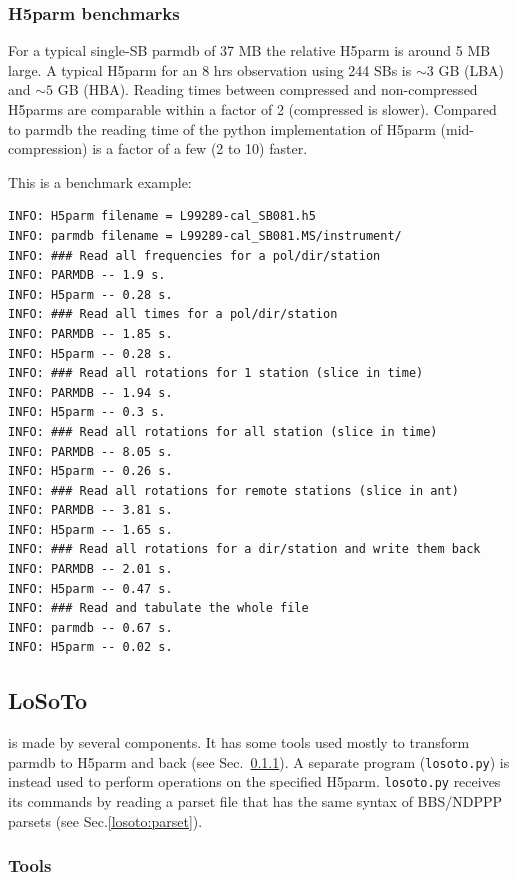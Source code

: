 \subsubsection{H5parm benchmarks}

For a typical single-SB parmdb of 37 MB the relative H5parm is around 5 MB large. A typical H5parm for an 8 hrs observation using 244 SBs is $\sim 3$ GB (LBA) and $\sim 5$ GB (HBA). Reading times between compressed and non-compressed H5parms are comparable within a factor of 2 (compressed is slower). Compared to parmdb the reading time of the python implementation of H5parm (mid-compression) is a factor of a few (2 to 10) faster.

This is a benchmark example:

\begin{verbatim}
INFO: H5parm filename = L99289-cal_SB081.h5
INFO: parmdb filename = L99289-cal_SB081.MS/instrument/
INFO: ### Read all frequencies for a pol/dir/station
INFO: PARMDB -- 1.9 s.
INFO: H5parm -- 0.28 s.
INFO: ### Read all times for a pol/dir/station
INFO: PARMDB -- 1.85 s.
INFO: H5parm -- 0.28 s.
INFO: ### Read all rotations for 1 station (slice in time)
INFO: PARMDB -- 1.94 s.
INFO: H5parm -- 0.3 s.
INFO: ### Read all rotations for all station (slice in time)
INFO: PARMDB -- 8.05 s.
INFO: H5parm -- 0.26 s.
INFO: ### Read all rotations for remote stations (slice in ant)
INFO: PARMDB -- 3.81 s.
INFO: H5parm -- 1.65 s.
INFO: ### Read all rotations for a dir/station and write them back
INFO: PARMDB -- 2.01 s.
INFO: H5parm -- 0.47 s.
INFO: ### Read and tabulate the whole file
INFO: parmdb -- 0.67 s.
INFO: H5parm -- 0.02 s.
\end{verbatim}

\subsection{LoSoTo}
\label{losoto:overview}

\losoto{} is made by several components. It has some tools used mostly to transform parmdb to H5parm and back (see Sec.~\ref{losoto:tools}). A separate program (\texttt{losoto.py}) is instead used to perform operations on the specified H5parm. \texttt{losoto.py} receives its commands by reading a parset file that has the same syntax of BBS/NDPPP parsets (see Sec.\ref{losoto:parset}).

\subsubsection{Tools}
\label{losoto:tools}

